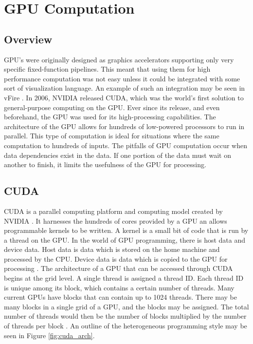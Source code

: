 \section{GPU Computation}
\subsection{Overview}
GPU's were originally designed as graphics accelerators supporting only very specific fixed-function pipelines. This meant that using them for high performance computation was not easy unless it could be integrated with some sort of visualization language. An example of such an integration may be seen in vFire \cite{vFire}. In 2006, NVIDIA released CUDA, which was the world's first solution to general-purpose computing on the GPU. Ever since its release, and even beforehand, the GPU was used for its high-processing capabilities. The architecture of the GPU allows for hundreds of low-powered processors to run in parallel. This type of computation is ideal for situations where the same computation to hundreds of inputs. The pitfalls of GPU computation occur when data dependencies exist in the data. If one portion of the data must wait on another to finish, it limits the usefulness of the GPU for processing. 

\subsection{CUDA}
CUDA is a parallel computing platform and computing model created by NVIDIA \cite{cuda}. It harnesses the hundreds of cores provided by a GPU an allows programmable kernels to be written. A kernel is a small bit of code that is run by a thread on the GPU. In the world of GPU programming, there is host data and device data. Host data is data which is stored on the home machine and processed by the CPU. Device data is data which is copied to the GPU for processing \cite{cudabyexample}. The architecture of a GPU that can be accessed through CUDA begins at the grid level. A single thread is assigned a thread ID. Each thread ID is unique among its block, which contains a certain number of threads. Many current GPUs have blocks that can contain up to 1024 threads. There may be many blocks in a single grid of a GPU, and the blocks may be assigned. The total number of threads would then be the number of blocks multiplied by the number of threads per block \cite{cuda}. An outline of the heterogeneous programming style may be seen in Figure \ref{fig:cuda_arch}. 

